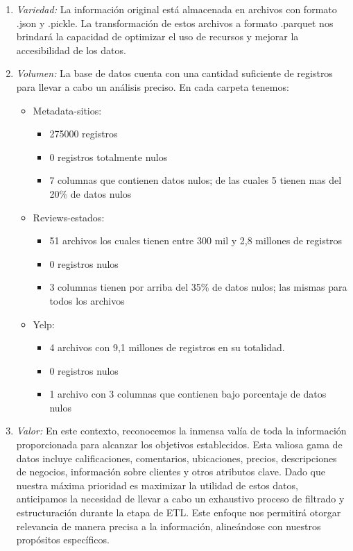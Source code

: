 \documentclass[12pt]{article}
\begin{document}
\begin{enumerate}
\begin{enumerate}
        \item \textit{Variedad:} La información original está almacenada en archivos con formato .json y .pickle. La transformación de estos archivos a formato .parquet nos brindará la capacidad de optimizar el uso de recursos y mejorar la accesibilidad de los datos.

        \item \textit{Volumen:} La base de datos cuenta con una cantidad suficiente de registros para llevar a cabo un análisis preciso. En cada carpeta tenemos:
        \begin{itemize}
            \item Metadata-sitios:
            \begin{itemize}
                \item 275000 registros
                \item 0 registros totalmente nulos
                \item 7 columnas que contienen datos nulos; de las cuales 5 tienen mas del 20\% de datos nulos
            \end{itemize}
            \item Reviews-estados:
            \begin{itemize}
                \item 51 archivos los cuales tienen entre 300 mil  y 2,8 millones de registros
                \item 0 registros nulos
                \item 3 columnas tienen por arriba del 35\% de datos nulos; las mismas para todos los archivos
            \end{itemize}
            \item Yelp:
            \begin{itemize}
                \item 4 archivos con 9,1 millones de registros en su totalidad.
                \item 0 registros nulos
                \item 1 archivo con 3 columnas que contienen bajo porcentaje de datos nulos
            \end{itemize}
        \end{itemize}

        \item \textit{Valor:} En este contexto, reconocemos la inmensa valía de toda la información proporcionada para alcanzar los objetivos establecidos. Esta valiosa gama de datos incluye calificaciones, comentarios, ubicaciones, precios, descripciones de negocios, información sobre clientes y otros atributos clave. Dado que nuestra máxima prioridad es maximizar la utilidad de estos datos, anticipamos la necesidad de llevar a cabo un exhaustivo proceso de filtrado y estructuración durante la etapa de ETL. Este enfoque nos permitirá otorgar relevancia de manera precisa a la información, alineándose con nuestros propósitos específicos.


\end{enumerate}
\end{enumerate}
\end{document}
